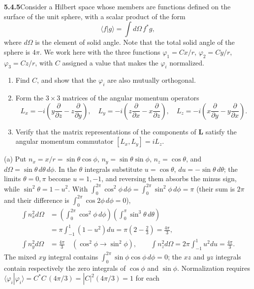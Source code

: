 \par\bigskip
\noindent\textbf{5.4.5}\quad Consider a Hilbert space whose members are
functions defined on the surface of the unit sphere, with a scalar product of
the form
\[
\langle f|g\rangle=\int d\Omega\,f^{*}g,
\]
where $d\Omega$ is the element of solid angle. Note that the total solid angle
of the sphere is $4\pi$. We work here with the three functions
$\varphi_{1}=Cx/r$, $\varphi_{2}=Cy/r$, $\varphi_{3}=Cz/r$, with $C$ assigned
a value that makes the $\varphi_{i}$ normalized.
\begin{enumerate}
\item[(a)] Find $C$, and show that the $\varphi_{i}$ are also mutually
  orthogonal.
\item[(b)] Form the $3\times3$ matrices of the angular momentum operators
  \[
  L_{x}=-i\left(y\frac{\partial}{\partial z}-z\frac{\partial}{\partial y}
  \right),\quad
  L_{y}=-i\left(z\frac{\partial}{\partial x}-x\frac{\partial}{\partial z}
  \right),\quad
  L_{z}=-i\left(x\frac{\partial}{\partial y}-y\frac{\partial}{\partial x}
  \right).
  \]
\item[(c)] Verify that the matrix representations of the components of
  $\mathbf{L}$ satisfy the angular momentum commutator
  $[L_{x},L_{y}]=iL_{z}$.
\end{enumerate}
\solution
(a) Put $n_x=x/r=\sin\theta\cos\phi$,
$n_y=\sin\theta\sin\phi$, $n_z=\cos\theta$, and
$d\Omega=\sin\theta\,d\theta\,d\phi$. In the $\theta$ integrals
substitute $u=\cos\theta$, $du=-\sin\theta\,d\theta$; the limits
$\theta=0,\pi$ become $u=1,-1$, and reversing them absorbs the minus
sign, while $\sin^2\theta=1-u^2$. With
$\int_0^{2\pi}\cos^2\phi\,d\phi=\int_0^{2\pi}\sin^2\phi\,d\phi=\pi$
(their sum is $2\pi$ and their difference is
$\int_0^{2\pi}\cos2\phi\,d\phi=0$),
\begin{align*}
\int n_x^2d\Omega
&=\left(\int_0^{2\pi}\cos^2\phi\,d\phi\right)
  \left(\int_0^\pi\sin^3\theta\,d\theta\right)\\
&=\pi\int_{-1}^1(1-u^2)du=\pi\left(2-\frac23\right)=\frac{4\pi}{3},\\
\int n_y^2d\Omega&=\frac{4\pi}{3}\quad(\cos^2\phi\to\sin^2\phi),\qquad
\int n_z^2d\Omega=2\pi\int_{-1}^1u^2du=\frac{4\pi}{3}.
\end{align*}
The mixed $xy$ integral contains
$\int_0^{2\pi}\sin\phi\cos\phi\,d\phi=0$; the $xz$ and $yz$
integrals contain respectively the zero integrals of $\cos\phi$ and
$\sin\phi$. Normalization requires
$\langle\varphi_i|\varphi_i\rangle=C^*C\,(4\pi/3)=|C|^2(4\pi/3)=1$ for each
